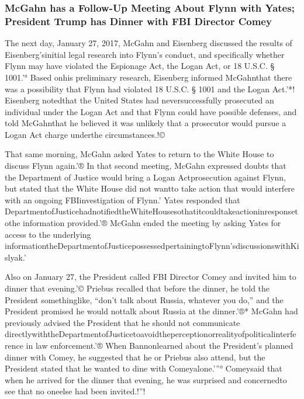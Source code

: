 \subsubsection{McGahn has a Follow-Up Meeting About Flynn with Yates; President Trump has Dinner with FBI Director Comey}

The next day, January 27, 2017, McGahn and Eisenberg discussed the results of Eisenberg’sinitial legal research into Flynn’s conduct, and specifically whether Flynn may have violated the Espionage Act, the Logan Act, or 18 U.S.C. § 1001.'° Based onhis preliminary research, Eisenberg informed McGahnthat there was a possibility that Flynn had violated 18 U.S.C. § 1001 and the Logan Act.'*! Eisenberg notedthat the United States had neversuccessfully prosecuted an individual under the Logan Act and that Flynn could have possible defenses, and told McGahnthat he believed it was unlikely that a prosecutor would pursue a Logan Act charge underthe circumstances.!©

That same morning, McGahn asked Yates to return to the White House to discuss Flynn again.'® In that second meeting, McGahn expressed doubts that the Department of Justice would bring a Logan Actprosecution against Flynn, but stated that the White House did not wantto take action that would interfere with an ongoing FBIinvestigation of Flynn.' Yates responded that DepartmentofJusticehadnotifiedtheWhiteHousesothatitcouldtakeactioninresponsetothe information provided.'® McGahn ended the meeting by asking Yates for access to the underlying informationtheDepartmentofJusticepossessedpertainingtoFlynn’sdiscussionswithKislyak.'%

Also on January 27, the President called FBI Director Comey and invited him to dinner that evening.'© Priebus recalled that before the dinner, he told the President somethinglike, “don’t talk about Russia, whatever you do,” and the President promised he would nottalk about Russia at the dinner.'®* McGahn had previously advised the President that he should not communicate directlywiththeDepartmentofJusticetoavoidtheperceptionorrealityofpoliticalinterference in law enforcement.'® When Bannonlearned about the President’s planned dinner with Comey, he suggested that he or Priebus also attend, but the President stated that he wanted to dine with Comeyalone.'”° Comeysaid that when he arrived for the dinner that evening, he was surprised and concernedto see that no oneelse had been invited.!”!

